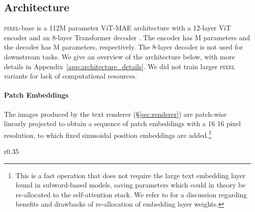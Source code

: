 \documentclass{article}
\newcommand{\model}{\textsc{pixel}\xspace}
\begin{document}
\vspace{-2mm}
\subsection{Architecture}
\vspace{-2mm}

\model-base is a 112M parameter ViT-MAE architecture \citep{he-etal-2022-mae} with a 12-layer ViT encoder \citep{dosovitskiy2021an} and an 8-layer Transformer decoder \citep{DBLP:conf/nips/VaswaniSPUJGKP17}. The encoder has M parameters and the decoder has M parameters, respectively. The 8-layer decoder is not used for downstream tasks. We give an overview of the architecture below, with more details in Appendix~\ref{app:architecture_details}. We did not train larger \model variants for lack of computational resources.

\vspace{-2mm}
\paragraph{Patch Embeddings} The images produced by the text renderer (\S\ref{sec:renderer}) are patch-wise linearly projected to obtain a sequence of patch embeddings with a 16  16 pixel resolution, to which fixed sinusoidal position embeddings are added.\footnote{This is a fast operation that does not require the large text embedding layer found in subword-based models, saving parameters which could in theory be re-allocated to the self-attention stack. We refer to \citet{xue-etal-2022-byt5} for a discussion regarding benefits and drawbacks of re-allocation of embedding layer weights.}

\begin{wrapfigure}{r}{0.35\textwidth}
    \vspace{-2.25em}
    \centering
    \begin{minipage}{\linewidth}
    \begin{algorithm}[H]
    \caption{\model Span Masking}\label{algo:span_masking}
    \begin{algorithmic}
        \scriptsize
        \State 
        \Until{} \Return{}
    \end{algorithmic}
    \end{algorithm}
    \end{minipage}
    \vspace{-1em}
\end{wrapfigure}
\end{document}

